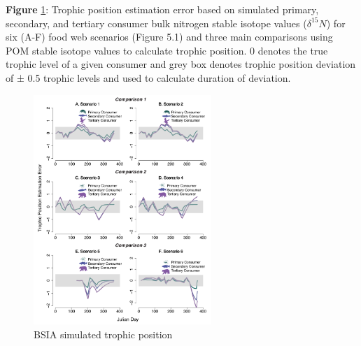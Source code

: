 \documentclass [11pt, proquest] {uwthesis}[2015/03/03]
\begin{document}
\textbf{Figure} \ref{fig:BSIATP}: Trophic position estimation error
based on simulated primary, secondary, and tertiary consumer bulk
nitrogen stable isotope values (\(\delta^{15}N\)) for six (A-F) food web
scenarios (Figure 5.1) and three main comparisons using POM stable
isotope values to calculate trophic position. 0 denotes the true trophic
level of a given consumer and grey box denotes trophic position
deviation of ± 0.5 trophic levels and used to calculate duration of
deviation. \newline 
\begin{figure}[h]
\centering
  \includegraphics[width=0.6\textwidth]{figure/Ch5/Figure5.pdf}
  \caption{BSIA simulated trophic position}
  \label{fig:BSIATP}
\end{figure}
\clearpage
\end{document}
